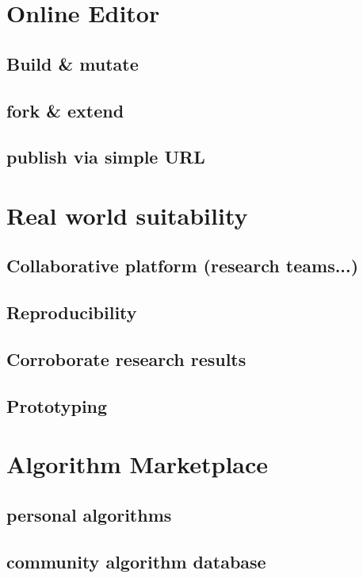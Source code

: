 \section{Online Editor}
\label{sect:online_editor}

	\subsection{Build \& mutate}
	\label{ssect: build_edit}
	
	\subsection{fork \& extend}
	\label{ssect: fork_extend}
	
	\subsection{publish via simple URL}
	\label{ssect: publish_url}



\section{Real world suitability}
\label{sect:realworld_suitability}

	\subsection{Collaborative platform (research teams...)}
	\label{ssect:collaborative_platform}

	\subsection{Reproducibility}
	\label{ssect:reproducibility}

	\subsection{Corroborate research results}
	\label{ssect: corroborate_results}
		
	\subsection{Prototyping}
	\label{ssect: prototyping}



\section{Algorithm Marketplace}
\label{sect:algo_marketplace}

\subsection{personal algorithms}
\label{ssect:algo_personal}

\subsection{community algorithm database}
\label{ssect:community_algo_db}
	